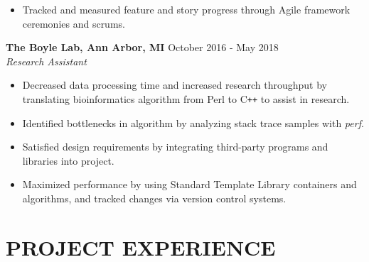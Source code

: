\documentclass[overlapped]{res}
\begin{document}
\begin{resume}
\begin{itemize}
                  \item Tracked and measured feature and story progress through
                  Agile framework ceremonies and scrums.

                \end{itemize}

                \textbf{The Boyle Lab, Ann Arbor, MI}
                \hfill October 2016 - May 2018 \\
                {\sl Research Assistant}
                 \begin{itemize}  \itemsep -2pt %
                 \item Decreased data processing time and increased research throughput
                  by translating bioinformatics algorithm 
                 from Perl to C\texttt{++}
                 to assist in research.
                 
                 \item Identified bottlenecks in algorithm by analyzing stack trace samples with \textit{perf}.
                 
                 \item Satisfied design requirements by integrating third-party programs 
                 and libraries into project.
                 
                 \item Maximized performance by using 
                 Standard Template Library containers and algorithms,
                 and tracked changes via version control systems.
                \end{itemize}


 \section{PROJECT EXPERIENCE}
      

\end{resume}
\end{document}
